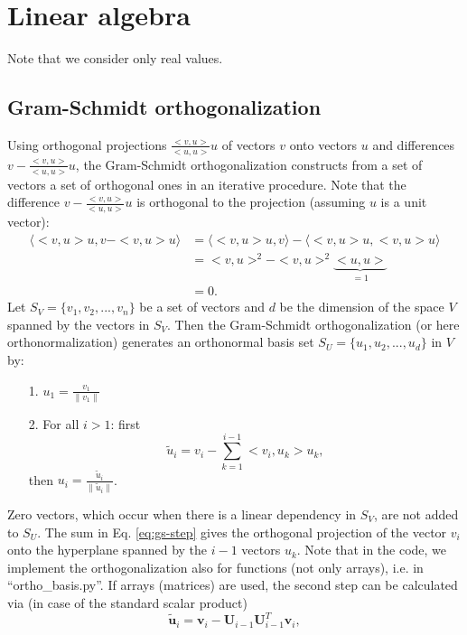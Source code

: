 \documentclass[11pt, a4paper, parskip=half*, bibliography=totoc, cleardoublepage=empty, final,
numbers=noenddot]{scrbook}
\begin{document}
\chapter{Linear algebra}
Note that we consider only real values.
\section{Gram-Schmidt orthogonalization}
Using orthogonal projections $\frac{<v, u>} {<u, u>} u$ of vectors $v$ onto vectors $u$ and differences $v - \frac{<v, u>}{<u, u>} u$, the Gram-Schmidt orthogonalization constructs from a set of vectors a set of orthogonal ones in an iterative procedure. Note that the difference $v - \frac{<v, u>}{<u, u>} u$ is orthogonal to the projection (assuming $u$ is a unit vector):
\begin{align}
\langle <v, u> u, v- <v, u> u \rangle &= \langle <v, u> u, v \rangle - \langle <v, u> u, <v, u> u \rangle \\
&= <v, u>^2 - <v, u>^2 \underbrace{<u, u>}_{=1} \\
&= 0.
\label{eq:orthogonal-proj-zero}
\end{align}
Let $S_V = \{v_1, v_2, ..., v_n\}$ be a set of vectors and $d$ be the dimension of the space $V$ spanned by the vectors in $S_V$. Then the Gram-Schmidt orthogonalization (or here orthonormalization) generates an orthonormal basis set $S_U = \{u_1, u_2, ..., u_d\}$ in $V$ by:
\begin{itemize}
\item[1.] $u_1 = \frac{v_1}{\| v_1\|}$
\item[2.] For all $i>1$: first
\begin{equation}
\tilde{u}_i = v_i - \sum_{k=1}^{i-1} <v_i, u_k> u_k     ,
\label{eq:gs-step}
\end{equation} 
then $u_i = \frac{\tilde{u}_i}{\| \tilde{u}_i\|}$.
\end{itemize}
Zero vectors, which occur when there is a linear dependency in $S_V$, are not added to $S_U$. The sum in Eq. \ref{eq:gs-step} gives the orthogonal projection of the vector $v_i$ onto the hyperplane spanned by the $i-1$ vectors $u_k$. Note that in the code, we implement the orthogonalization also for functions (not only arrays), i.e. in ``ortho\_basis.py''. If arrays (matrices) are used, the second step can be calculated via (in case of the standard scalar product)
\begin{equation}
\tilde{\bm{u}}_i = \bm{v}_i - \bm{U}_{i-1}  \bm{U}^T_{i-1}  \bm{v}_i     ,
\end{equation} 
\end{document}
